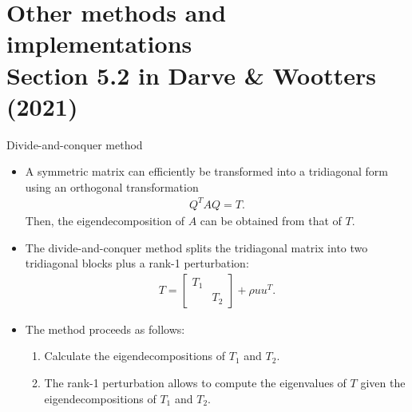\documentclass[t,usepdftitle=false]{beamer}
\begin{document}

\section{Other methods and implementations\\{\small Section 5.2 in Darve \& Wootters (2021)}}

\begin{frame}{Divide-and-conquer method}
\begin{itemize}
\item A symmetric matrix can efficiently be transformed into a tridiagonal form using an orthogonal transformation 
\begin{align*}
Q^TAQ=T.
\end{align*}
Then, the eigendecomposition of $A$ can be obtained from that of $T$. 
\item The divide-and-conquer method splits the tridiagonal matrix into two tridiagonal blocks plus a rank-1 perturbation:
\begin{align*}
T=\begin{bmatrix}T_1&\\&T_2\end{bmatrix}+\rho uu^T.
\end{align*}
\item The method proceeds as follows:
\begin{enumerate}\normalsize
\item Calculate the eigendecompositions of $T_1$ and $T_2$.\vspace{.1cm}
\item The rank-1 perturbation allows to compute the eigenvalues of $T$ given the eigendecompositions of $T_1$ and $T_2$.
\end{enumerate}
\end{itemize}
\end{frame}
\end{document}
